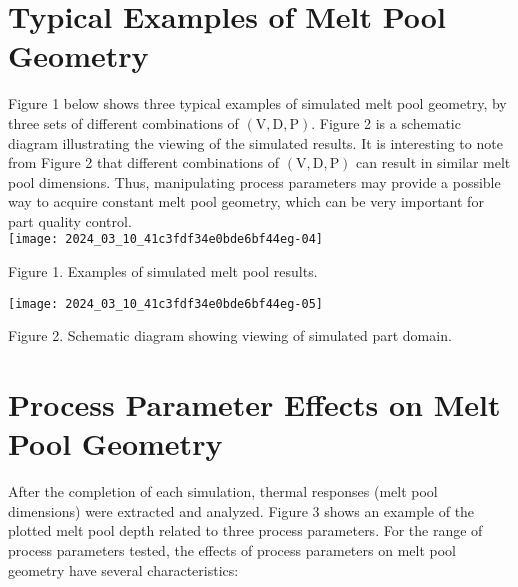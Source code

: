 \documentclass[10pt]{article}
\begin{document}
\section*{Typical Examples of Melt Pool Geometry}
Figure 1 below shows three typical examples of simulated melt pool geometry, by three sets of different combinations of $(\mathrm{V}, \mathrm{D}, \mathrm{P})$. Figure 2 is a schematic diagram illustrating the viewing of the simulated results. It is interesting to note from Figure 2 that different combinations of $(\mathrm{V}, \mathrm{D}, \mathrm{P})$ can result in similar melt pool dimensions. Thus, manipulating process parameters may provide a possible way to acquire constant melt pool geometry, which can be very important for part quality control.\\
\texttt{[image: 2024\_03\_10\_41c3fdf34e0bde6bf44eg-04]}

Figure 1. Examples of simulated melt pool results.

\begin{center}
\texttt{[image: 2024\_03\_10\_41c3fdf34e0bde6bf44eg-05]}
\end{center}

Figure 2. Schematic diagram showing viewing of simulated part domain.

\section*{Process Parameter Effects on Melt Pool Geometry}
After the completion of each simulation, thermal responses (melt pool dimensions) were extracted and analyzed. Figure 3 shows an example of the plotted melt pool depth related to three process parameters. For the range of process parameters tested, the effects of process parameters on melt pool geometry have several characteristics:
\end{document}
